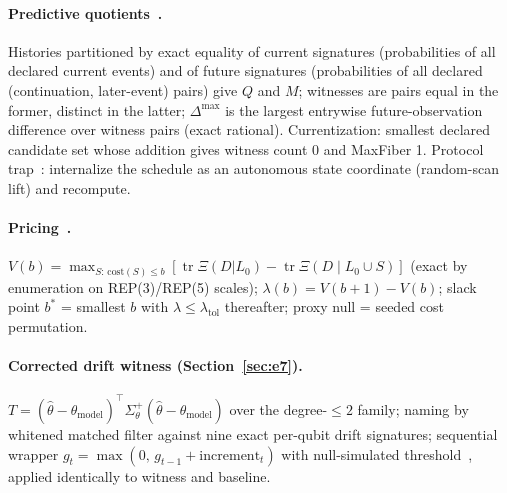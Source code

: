 \documentclass[11pt]{article}
\theoremstyle{definition}
\begin{document}
\paragraph{Predictive quotients~\cite{sbt-hol}.} Histories partitioned by exact equality of current signatures (probabilities of all declared current events) and of future signatures (probabilities of all declared (continuation, later-event) pairs) give $Q$ and $M$; witnesses are pairs equal in the former, distinct in the latter; $\Delta^{\max}$ is the largest entrywise future-observation difference over witness pairs (exact rational). Currentization: smallest declared candidate set whose addition gives witness count 0 and MaxFiber 1. Protocol trap~\cite{sbt-pt}: internalize the schedule as an autonomous state coordinate (random-scan lift) and recompute.

\paragraph{Pricing~\cite{sbt-spend}.} $V(b) = \max_{S:\, \mathrm{cost}(S) \le b} [\operatorname{tr}\Xi(D|L_0) - \operatorname{tr}\Xi(D \mid L_0 \cup S)]$ (exact by enumeration on REP(3)/REP(5) scales); $\lambda(b) = V(b{+}1) - V(b)$; slack point $b^{*}$ = smallest $b$ with $\lambda \le \lambda_{\mathrm{tol}}$ thereafter; proxy null = seeded cost permutation.

\paragraph{Corrected drift witness (Section~\ref{sec:e7}).} $T = (\hat\theta - \theta_{\mathrm{model}})^{\top} \Sigma_\theta^{+} (\hat\theta - \theta_{\mathrm{model}})$ over the degree-$\le2$ family; naming by whitened matched filter against nine exact per-qubit drift signatures; sequential wrapper $g_t = \max(0,\, g_{t-1} + \mathrm{increment}_t)$ with null-simulated threshold~\cite{page1954continuous}, applied identically to witness and baseline.

 
\clearpage


\end{document}
